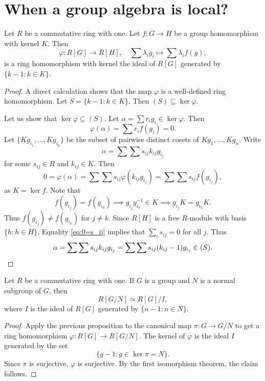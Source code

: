 \section{When a group algebra is local?}

\begin{proposition}
    \label{pro:augmentation}
    Let $R$ be a commutative ring with one. 
    Let $f\colon G\to H$ be a group homomorphism with kernel $K$. Then
    \[
    \varphi\colon R[G]\to R[H],
    \quad 
    \sum\lambda_ig_i\mapsto \sum\lambda_if(g),
    \]
    is a ring homomorphism with kernel the ideal 
    of $R[G]$ generated by $\{k-1:k\in K\}$. 
\end{proposition}

\begin{proof}
    A direct calculation shows that the map $\varphi$ is a well-defined ring homomorphism. Let 
    $S=\{k-1:k\in K\}$. Then $(S)\subseteq \ker\varphi$. 
    
    Let us show that 
    $\ker\varphi\subseteq (S)$. Let $\alpha=\sum r_ig_i\in\ker\varphi$. Then 
    \[
    \varphi(\alpha)=\sum r_if(g_i)=0.
    \]
    Let 
    $\{Kg_{i_1},\dots,Kg_{i_k}\}$ be the subset of pairwise distinct cosets 
    of $Kg_1,\dots,Kg_n$. Write  
    \[
    \alpha=\sum\sum s_{ij}k_{ij}g_{i_j}
    \]
    for some $s_{ij}\in R$ and $k_{ij}\in K$. Then 
    \begin{equation}
    \label{eq:0=s_ij}
    0=\varphi(\alpha)=\sum\sum s_{ij}\varphi(k_{ij}g_{i_j})
    =\sum\sum s_{ij}f(g_{i_j}),
    \end{equation}
    as $K=\ker f$. Note that 
    \[
    f(g_{i_j})=f(g_{i_k})\implies 
    g_{i_j}g_{i_k}^{-1}\in K\implies 
    g_{i_j}K=g_{i_k}K.
    \]
    Thus $f(g_{i_j})\ne f(g_{i_k})$ for $j\ne k$. Since $R[H]$ is a free $R$-module 
    with basis $\{h:h\in H\}$, Equality
    \eqref{eq:0=s_ij}
    implies that $\sum_i s_{ij}=0$ for all $j$. Thus
    \[
    \alpha=\sum\sum s_{ij}k_{ij}g_{i_j}=\sum\sum s_{ij}(k_{ij}-1)g_{i_j}\in (S).\qedhere
    \]
\end{proof}

\begin{corollary}
\label{cor:R[G/N]}
    Let $R$ be a commutative ring with one. If 
    $G$ is a group and $N$ is a normal subgroup of $G$, then
    \[
    R[G/N]\simeq R[G]/I,
    \]
    where $I$ is the ideal of $R[G]$ generated by $\{n-1:n\in N\}$. 
\end{corollary}

\begin{proof}
    Apply the previous proposition to the canonical map $\pi\colon G\to G/N$ to get
    a ring homomorphism $\varphi\colon R[G]\to R[G/N]$. The kernel of $\varphi$ is the ideal $I$ 
    generated by the set 
    \[
    \{g-1:g\in\ker\pi=N\}.
    \]
    Since 
    $\pi$ is surjective, $\varphi$ is surjective. 
    By the first isomorphism theorem, the claim follows. 
\end{proof}

